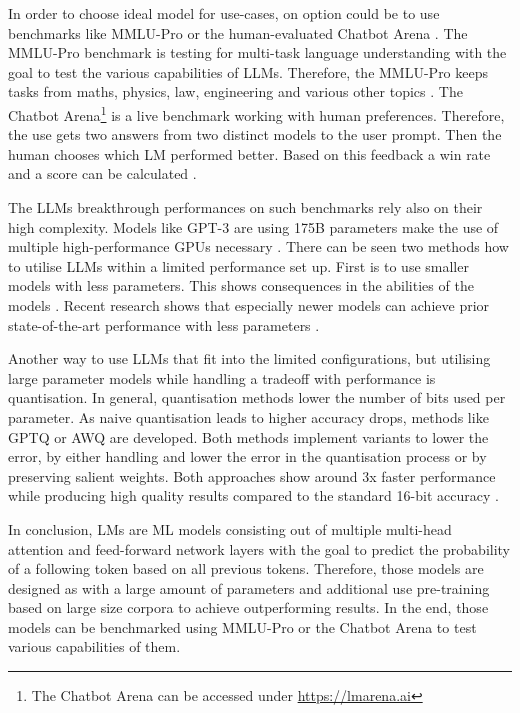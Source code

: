 \documentclass[a4paper,oneside,bibliography=totoc]{scrbook}
\begin{document}
In order to choose ideal model for use-cases, on option could be to use benchmarks like MMLU-Pro \cite{Wang2024} or the human-evaluated Chatbot Arena \cite{Chiang2024}. The MMLU-Pro benchmark is testing for multi-task language understanding with the goal to test the various capabilities of LLMs. Therefore, the MMLU-Pro keeps tasks from maths, physics, law, engineering and various other topics \cite{Wang2024}. The Chatbot Arena\footnote{The Chatbot Arena can be accessed under \url{https://lmarena.ai}} is a live benchmark working with human preferences. Therefore, the use gets two answers from two distinct models to the user prompt. Then the human chooses which \ac{LM} performed better. Based on this feedback a win rate and a score can be calculated \cite{Chiang2024}.

The \acp{LLM} breakthrough performances on such benchmarks rely also on their high complexity. Models like GPT-3 are using 175B parameters make the use of multiple high-performance GPUs necessary \cite{Brown2020,Frantar2023}. There can be seen two methods how to utilise \acp{LLM} within a limited performance set up. First is to use smaller models with less parameters. This shows consequences in the abilities of the models \cite{Brown2020,Grattafiori2024}. Recent research shows that especially newer models can achieve prior state-of-the-art performance with less parameters \cite{Meta2024}.

Another way to use \acp{LLM} that fit into the limited configurations, but utilising large parameter models while handling a tradeoff with performance is quantisation. In general, quantisation methods lower the number of bits used per parameter. As naive quantisation leads to higher accuracy drops, methods like GPTQ or AWQ are developed. Both methods implement variants to lower the error, by either handling and lower the error in the quantisation process or by preserving salient weights. Both approaches show around 3x faster performance while producing high quality results compared to the standard 16-bit accuracy \cite{Frantar2023,Lin2024}.

In conclusion, \acp{LM} are \ac{ML} models consisting out of multiple multi-head attention and feed-forward network layers with the goal to predict the probability of a following token based on all previous tokens. Therefore, those models are designed as with a large amount of parameters and additional use pre-training based on large size corpora to achieve outperforming results. In the end, those models can be benchmarked using MMLU-Pro or the Chatbot Arena to test various capabilities of them.
\end{document}
